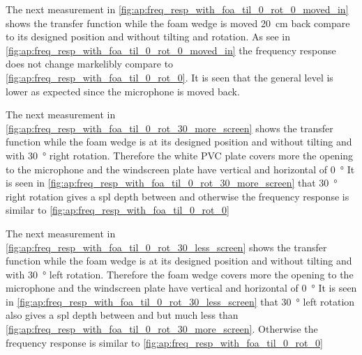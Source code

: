 The next measurement in  \autoref{fig:ap:freq_resp_with_foa_til_0_rot_0_moved_in} shows the transfer function while the foam wedge is moved \SI{20}{\centi\meter} back compare to its designed position and without tilting and rotation.
As see in \autoref{fig:ap:freq_resp_with_foa_til_0_rot_0_moved_in} the frequency response does not change markelibly compare to \autoref{fig:ap:freq_resp_with_foa_til_0_rot_0}. It is seen that the general level is  lower as expected since the microphone is moved back.


The next measurement in  \autoref{fig:ap:freq_resp_with_foa_til_0_rot_30_more_screen} shows the transfer function while the foam wedge is at its designed position and without tilting and with \SI{30}{\degree} right rotation. Therefore the white PVC plate covers more the opening to the microphone and the windscreen plate have vertical and horizontal of \SI{0}{\degree} 
It is seen in \autoref{fig:ap:freq_resp_with_foa_til_0_rot_30_more_screen} that \SI{30}{\degree} right rotation gives a \gls{spl} depth between  and  otherwise the frequency response is similar to \autoref{fig:ap:freq_resp_with_foa_til_0_rot_0}

The next measurement in  \autoref{fig:ap:freq_resp_with_foa_til_0_rot_30_less_screen} shows the transfer function while the foam wedge is at its designed position and without tilting and with \SI{30}{\degree} left rotation. Therefore the foam wedge covers more the opening to the microphone and the windscreen plate have vertical and horizontal of \SI{0}{\degree} 
It is seen in \autoref{fig:ap:freq_resp_with_foa_til_0_rot_30_less_screen} that \SI{30}{\degree} left rotation also gives a \gls{spl} depth between  and  but much less than  \autoref{fig:ap:freq_resp_with_foa_til_0_rot_30_more_screen}. Otherwise the frequency response is similar to \autoref{fig:ap:freq_resp_with_foa_til_0_rot_0}


